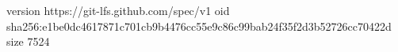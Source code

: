 version https://git-lfs.github.com/spec/v1
oid sha256:e1be0dc4617871c701cb9b4476cc55e9c86c99bab24f35f2d3b52726cc70422d
size 7524
